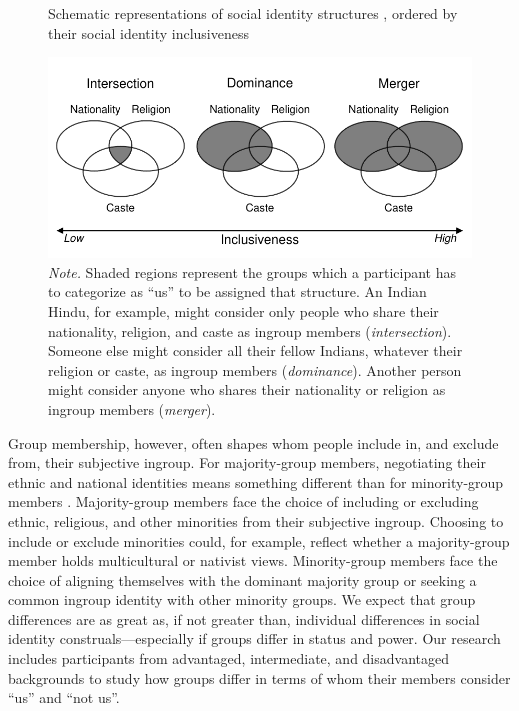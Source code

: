 \documentclass[12pt, a4paper]{article}
\begin{document}
\begin{figure}
\centering
\caption{
Schematic representations of social identity structures \protect\parencite{roccas_social_2002}, ordered by their social identity inclusiveness \protect\parencite{van_dommelen_construing_2015}
}
\includegraphics[scale=1]{../figures/figure-1}
\caption*{\textit{Note.} Shaded regions represent the groups which a participant has to categorize as “us” to be assigned that structure. An Indian Hindu, for example, might consider only people who share their nationality, religion, and caste as ingroup members (\emph{intersection}). Someone else might consider all their fellow Indians, whatever their religion or caste, as ingroup members (\emph{dominance}). Another person might consider anyone who shares their nationality or religion as ingroup members (\emph{merger}).}
\label{fig:f1}
\end{figure}

Group membership, however, often shapes whom people include in, and exclude from, their subjective ingroup. For majority-group members, negotiating their ethnic and national identities means something different than for minority-group members \parencite[for a review, see][]{dovidio_commonality_2009}. Majority-group members face the choice of including or excluding ethnic, religious, and other minorities from their subjective ingroup. Choosing to include or exclude minorities could, for example, reflect whether a majority-group member holds multicultural or nativist views. Minority-group members face the choice of aligning themselves with the dominant majority group or seeking a common ingroup identity with other minority groups. We expect that group differences are as great as, if not greater than, individual differences in social identity construals---especially if groups differ in status and power. Our research includes participants from advantaged, intermediate, and disadvantaged backgrounds to study how groups differ in terms of whom their members consider “us” and “not us”.
\end{document}
